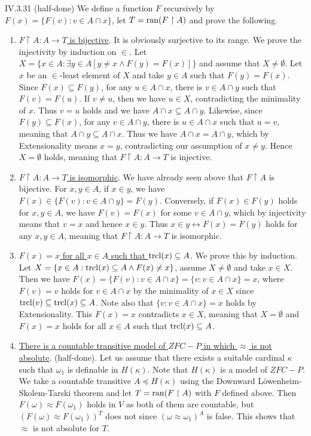 \documentclass[12pt]{article}
\begin{document}
\begin{customthm}{IV.3.31} (half-done)
  We define a function $F$ recursively by $F(x)=\{F(v):v\in A\cap x\}$, let $T=\mathop{\mathrm{ran}}(F\upharpoonright A)$ and prove the following.
  \begin{enumerate}
    \item\underline{$F\upharpoonright A:A\rightarrow T$ is bijective}. It is obviously surjective to its range. We prove the injectivity by induction on $\in$. Let $X=\{x\in A:\exists y\in A[y\neq x\wedge F(y)=F(x)]\}$ and assume that $X\neq\emptyset$. Let $x$ be an $\in$-least element of $X$ and take $y\in A$ such that $F(y)=F(x)$. Since $F(x)\subseteq F(y)$, for any $u\in A\cap x$, there is $v\in A\cap y$ such that $F(v)=F(u)$. If $v\neq u$, then we have $u\in X$, contradicting the minimality of $x$. Thus $v=u$ holds and we have $A\cap x\subseteq A\cap y$. Likewise, since $F(y)\subseteq F(x)$, for any $v\in A\cap y$, there is $u\in A\cap x$ such that $u=v$, meaning that $A\cap y\subseteq A\cap x$. Thus we have $A\cap x=A\cap y$, which by Extensionality means $x=y$, contradicting our assumption of $x\neq y$. Hence $X=\emptyset$ holds, meaning that $F\upharpoonright A:A\rightarrow T$ is injective.
    \item\underline{$F\upharpoonright A:A\rightarrow T$ is isomorphic}. We have already seen above that $F\upharpoonright A$ is bijective. For $x,y\in A$, if $x\in y$, we have $F(x)\in\{F(v):v\in A\cap y\}=F(y)$. Conversely, if $F(x)\in F(y)$ holds for $x,y\in A$, we have $F(v)=F(x)$ for some $v\in A\cap y$, which by injectivity means that $v=x$ and hence $x\in y$. Thus $x\in y\leftrightarrow F(x)=F(y)$ holds for any $x,y\in A$, meaning that $F\upharpoonright A:A\rightarrow T$ is isomorphic.
    \item\underline{$F(x)=x$ for all $x\in A$ such that $\mathop{\mathrm{trcl}}(x)\subseteq A$}. We prove this by induction. Let $X=\{x\in A:\mathop{\mathrm{trcl}}(x)\subseteq A\wedge F(x)\neq x\}$, assume $X\neq\emptyset$ and take $x\in X$. Then we have $F(x)=\{F(v):v\in A\cap x\}=\{v:v\in A\cap x\}=x$, where $F(v)=v$ holds for $v\in A\cap x$ by the minimality of $x\in X$ since $\mathop{\mathrm{trcl}}(v)\subseteq\mathop{\mathrm{trcl}}(x)\subseteq A$. Note also that $\{v:v\in A\cap x\}=x$ holds by Extensionality. This $F(x)=x$ contradicts $x\in X$, meaning that $X=\emptyset$ and $F(x)=x$ holds for all $x\in A$ such that $\mathop{\mathrm{trcl}}(x)\subseteq A$.
    \item\underline{There is a countable transitive model of $ZFC-P$ in which $\approx$ is not absolute}. (half-done). Let us assume that there exists a suitable cardinal $\kappa$ such that $\omega_1$ is definable in $H(\kappa)$. Note that $H(\kappa)$ is a model of $ZFC-P$. We take a countable transitive $A\preccurlyeq H(\kappa)$ using the Downward Löwenheim-Skolem-Tarski theorem and let $T=\mathop{\mathrm{ran}}(F\upharpoonright A)$ with $F$ defined above. Then $F(\omega)\approx F(\omega_1)$ holds in $V$ as both of them are countable, but $(F(\omega)\approx F(\omega_1))^T$ does not since $(\omega\approx\omega_1)^A$ is false. This shows that $\approx$ is not absolute for $T$.
  \end{enumerate}
\end{customthm}
\end{document}
